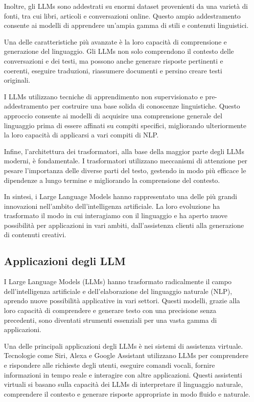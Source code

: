 \documentclass[a4paper,twoside,12pt]{toptesi}
\begin{document}
Inoltre, gli LLMs sono addestrati su enormi dataset provenienti da una varietà di fonti, tra cui libri, articoli e conversazioni online. Questo ampio addestramento consente ai modelli di apprendere un'ampia gamma di stili e contenuti linguistici.

Una delle caratteristiche più avanzate è la loro capacità di comprensione e generazione del linguaggio. Gli LLMs non solo comprendono il contesto delle conversazioni e dei testi, ma possono anche generare risposte pertinenti e coerenti, eseguire traduzioni, riassumere documenti e persino creare testi originali.

I LLMs utilizzano tecniche di apprendimento non supervisionato e pre-addestramento per costruire una base solida di conoscenze linguistiche. Questo approccio consente ai modelli di acquisire una comprensione generale del linguaggio prima di essere affinati su compiti specifici, migliorando ulteriormente la loro capacità di applicarsi a vari compiti di NLP.

Infine, l'architettura dei trasformatori, alla base della maggior parte degli LLMs moderni, è fondamentale. I trasformatori utilizzano meccanismi di attenzione per pesare l'importanza delle diverse parti del testo, gestendo in modo più efficace le dipendenze a lungo termine e migliorando la comprensione del contesto.

In sintesi, i Large Language Models hanno rappresentato una delle più grandi innovazioni nell'ambito dell'intelligenza artificiale. La loro evoluzione ha trasformato il modo in cui interagiamo con il linguaggio e ha aperto nuove possibilità per applicazioni in vari ambiti, dall'assistenza clienti alla generazione di contenuti creativi.

\subsection{Applicazioni degli LLM}

I Large Language Models (LLMs) hanno trasformato radicalmente il campo dell'intelligenza artificiale e dell'elaborazione del linguaggio naturale (NLP), aprendo nuove possibilità applicative in vari settori. Questi modelli, grazie alla loro capacità di comprendere e generare testo con una precisione senza precedenti, sono diventati strumenti essenziali per una vasta gamma di applicazioni.

Una delle principali applicazioni degli LLMs è nei sistemi di assistenza virtuale. Tecnologie come Siri, Alexa e Google Assistant utilizzano LLMs per comprendere e rispondere alle richieste degli utenti, eseguire comandi vocali, fornire informazioni in tempo reale e interagire con altre applicazioni. Questi assistenti virtuali si basano sulla capacità dei LLMs di interpretare il linguaggio naturale, comprendere il contesto e generare risposte appropriate in modo fluido e naturale.
\end{document}
